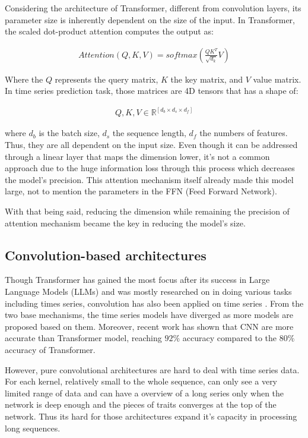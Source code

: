 \documentclass[10pt,journal,compsoc]{IEEEtran}
\begin{document}
Considering the architecture of Transformer, different from convolution layers, its parameter size is inherently dependent on the size of the input. In Transformer, the scaled dot-product attention \cite{attention-is-all-you-need} computes the output as:

\begin{gather}
    Attention(Q,K,V)=softmax(\frac{QK^T}{\sqrt{d_k}}V)
\end{gather}

Where the $Q$ represents the query matrix, $K$ the key matrix, and $V$ value matrix. In time series prediction task, those matrices are 4D tensors that has a shape of:

\begin{gather}
        Q,K,V\in \mathbb{R}^{[d_b \times d_s \times d_f]}
\end{gather}

where $d_b$ is the batch size, $d_s$ the sequence length, $d_f$ the numbers of features. Thus, they are all dependent on the input size. Even though it can be addressed through a linear layer that maps the dimension lower, it's not a common approach due to the huge information loss through this process which decreases the model's precision. This attention mechanism itself already made this model large, not to mention the parameters in the FFN (Feed Forward Network). 

With that being said, reducing the dimension while remaining the precision of attention mechanism became the key in reducing the model's size. 

\subsection{Convolution-based architectures}

Though Transformer has gained the most focus after its success in Large Language Models (LLMs) and was mostly researched on in doing various tasks including times series, convolution has also been applied on time series \cite{hewage2020temporal}. From the two base mechanisms, the time series models have diverged as more models are proposed based on them. Moreover, recent work \cite{cnntransformercompare} has shown that CNN are more accurate than Transformer model, reaching $92\%$ accuracy compared to the $80\%$ accuracy of Transformer. 

However, pure convolutional architectures are hard to deal with time series data. For each kernel, relatively small to the whole sequence, can only see a very limited range of data and can have a overview of a long series only when the network is deep enough and the pieces of traits converges at the top of the network. Thus its hard for those architectures expand it's capacity in processing long sequences. 
\end{document}
